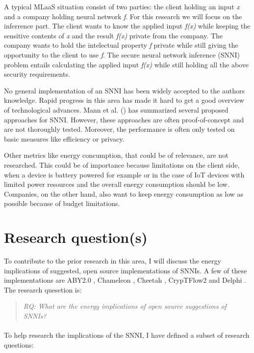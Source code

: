 \documentclass{uva-inf-article}
\begin{document}
A typical MLaaS situation consist of two parties: the client holding an input \textit{x} and a company holding neural network \textit{f}. For this research we will focus on the inferrence part. The client wants to know the applied input \textit{f(x)} while keeping the sensitive contents of \textit{x} and the result \textit{f(x)} private from the company. The company wants to hold the intelectual property \textit{f} private while still giving the opportunity to the client to use \textit{f}. The secure neural network inference (SNNI) problem entails calculating the applied input \textit{f(x)} while still holding all the above security requirements. 

No general implementation of an SNNI has been widely accepted to the authors knowledge. Rapid progress in this area has made it hard to get a good overview of technological advances. Mann et al. (\citeyear{Mann22}) has summarized several proposed approaches for SNNI. However, these approaches are often proof-of-concept and are not thoroughly tested. Moreover, the performance is often only tested on basic measures like efficiency or privacy.

Other metrics like energy concumption, that could be of relevance, are not researched. This could be of importance because limitations on the client side, when a device is battery powered for example or in the case of IoT devices with limited power resources and the overall energy consumption should be low. Companies, on the other hand, also want to keep energy consumption as low as possible because of budget limitations.

\section{Research question(s)}
To contribute to the prior research in this area, I will discuss the energy implications of suggested, open source implementations of SNNIs. A few of these implementations are ABY2.0 \parencite{ABY20}, Chameleon \parencite{Chameleon}, Cheetah \parencite{Cheetah}, CrypTFlow2 \parencite{CrypTFlow2} and Delphi \parencite{Delphi}. The research quesetion is:
\begin{quote} \emph{RQ: What are the energy implications of open source suggestions of SNNIs?} \end{quote} \paragraph{}

To help research the implications of the SNNI, I have defined a subset of research questions:
\end{document}
